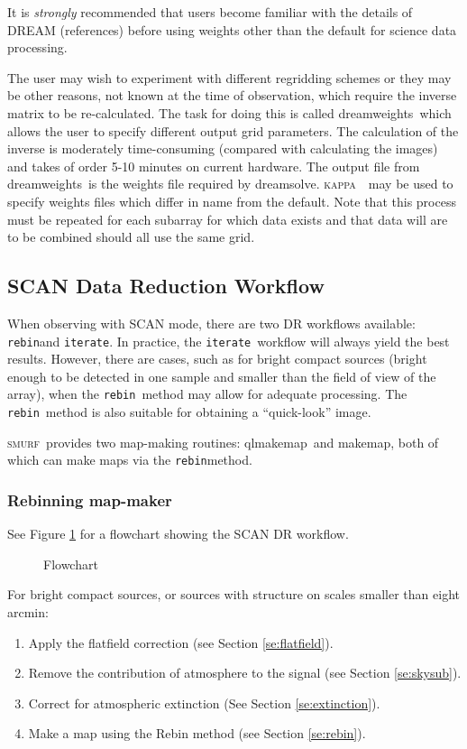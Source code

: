 \documentclass[twoside,11pt]{article}
\newcommand{\xref}[3]{#1}
\newcommand{\xlabel}[1]{}
\renewcommand{\_}{\texttt{\symbol{95}}}
\newcommand{\KAPPA}{\textsc{kappa}}
\newcommand{\SMURF}{\textsc{smurf}}
\newcommand{\task}[1]{\textsf{#1}}
\newcommand{\dreamsolve}{\xref{\task{dreamsolve}}{sun258}{DREAMSOLVE}}
\newcommand{\dreamweights}{\xref{\task{dreamweights}}{sun258}{DREAMWEIGHTS}}
\newcommand{\qlmakemap}{\xref{\task{qlmakemap}}{sun258}{QLMAKEMAP}}
\newcommand{\makemap}{\xref{\task{makemap}}{sun258}{MAKEMAP}}
\newcommand{\rebin}{\texttt{rebin}}
\newcommand{\iterate}{\texttt{iterate}}
\begin{document}
It is {\em strongly} recommended that users become familiar with the
details of DREAM (references) before using weights other than the
default for science data processing.

The user may wish to experiment with different regridding schemes or
they may be other reasons, not known at the time of observation, which
require the inverse matrix to be re-calculated. The task for doing
this is called \dreamweights\ which allows the user to specify
different output grid parameters. The calculation of the inverse is
moderately time-consuming (compared with calculating the images) and
takes of order 5-10 minutes on current hardware. The output file from
\dreamweights\ is the weights file required by \dreamsolve. \KAPPA\
\fitsedit\ may be used to specify weights files which differ in name
from the default. Note that this process must be repeated for each
subarray for which data exists and that data will are to be combined
should all use the same grid.

\subsection{\xlabel{scanworkflow}SCAN Data Reduction Workflow\label{se:scanworkflow}}

When observing with SCAN mode, there are two DR workflows available:
\rebin and \iterate. In practice, the \iterate\ workflow will always
yield the best results. However, there are cases, such as for bright
compact sources (bright enough to be detected in one sample and
smaller than the field of view of the array), when the \rebin\ method
may allow for adequate processing. The \rebin\ method is also suitable
for obtaining a ``quick-look'' image.

\SMURF\ provides two map-making routines: \qlmakemap\ and \makemap,
both of which can make maps via the \rebin method.

\subsubsection{\xlabel{rebin}Rebinning map-maker\label{se:rebin}}

See Figure \ref{flow} for a flowchart showing the SCAN DR workflow.

\begin{figure}
\caption{Flowchart\label{flow}}
\end{figure}

For bright compact sources, or sources with structure on scales
smaller than eight arcmin:
\begin{enumerate}
\item Apply the flatfield correction (see Section \ref{se:flatfield}).
\item Remove the contribution of atmosphere to the signal (see Section \ref{se:skysub}).
\item Correct for atmospheric extinction (See Section \ref{se:extinction}).
\item Make a map using the Rebin method (see Section \ref{se:rebin}).
\end{enumerate}
\end{document}
